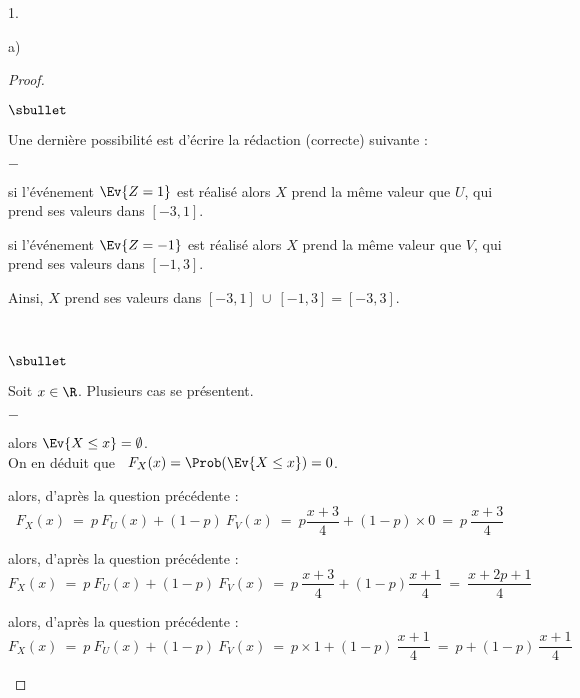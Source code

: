 \begin{noliste}{1.}
\begin{noliste}{a)}
\begin{proof}
\begin{remark}
\begin{noliste}{$\sbullet$}
        \item Une dernière possibilité est d'écrire la rédaction
          (correcte) suivante :
          \begin{noliste}{$-$}
          \item si l'événement $\Ev{Z = 1}$ est réalisé alors $X$
            prend la même valeur que $U$, \var qui prend ses valeurs
            dans $[-3,1]$.
          \item si l'événement $\Ev{Z = -1}$ est réalisé alors $X$
            prend la même valeur que $V$, \var qui prend ses valeurs
            dans $[-1,3]$.
          \end{noliste}
          Ainsi, $X$ prend ses valeurs dans $[-3, 1] \ \cup \ [-1,3]
          = [-3, 3]$.
        \end{noliste}
      \end{remark}~\\[-1.4cm]
      \begin{noliste}{$\sbullet$}
      \item Soit $x\in\R$. Plusieurs cas se présentent.
        \begin{noliste}{$-$}
        \item {} alors $\Ev{X \leq x} =
          \emptyset$.\\[.1cm]
          On en déduit que \ $F_X(x) = \Prob(\Ev{X\leq x}) = 0$.
    
        \item {} alors, d'après la question
          précédente : 
          \[
          F_X(x) \ = \ p \ F_U(x) + (1-p) \ F_V(x) \ = \ p
          \dfrac{x+3}{4} + (1-p) \times 0 \ = \ p \ \dfrac{x+3}{4}
          \]
          
        \item {} alors, d'après la question
          précédente : 
          \[
          F_X(x) \ = \ p \ F_U(x) + (1-p) \ F_V(x) \ = \ p \
          \dfrac{x+3}{4}+(1-p)\frac{x+1}{4} \ = \ \dfrac{x+2p+1}{4}
          \]
          
        \item {} alors, d'après la question
          précédente :
          \[
          F_X(x) \ = \ p \ F_U(x) + (1-p) \ F_V(x) \ = \ p \times 1 +
          (1-p) \ \dfrac{x+1}{4} \ = \ p + (1-p) \ \dfrac{x+1}{4}
          \]
          

\end{noliste}
\end{noliste}
\end{proof}
\end{noliste}
\end{noliste}
